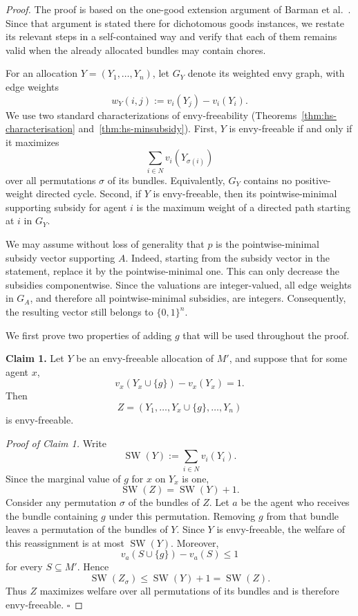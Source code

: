 \begin{proof}
The proof is based on the one-good extension argument of Barman et al.~\cite{BKNS22}. Since that argument is stated there for dichotomous goods instances, we restate its relevant steps in a self-contained way and verify that each of them remains valid when the already allocated bundles may contain chores.


For an allocation $Y=(Y_1,\ldots,Y_n)$, let $G_Y$ denote its weighted envy graph, with edge weights
\[
w_Y(i,j):=v_i(Y_j)-v_i(Y_i).
\]
We use two standard characterizations of envy-freeability
\cite{HS19,BKNS22} (Theorems~\ref{thm:hs-characterisation} and~\ref{thm:hs-minsubsidy}). First, $Y$ is envy-freeable if and only if it maximizes
\[
\sum_{i\in N}v_i(Y_{\sigma(i)})
\]
over all permutations $\sigma$ of its bundles. Equivalently, $G_Y$ contains no positive-weight directed cycle. Second, if $Y$ is envy-freeable, then its pointwise-minimal supporting subsidy for agent $i$ is the maximum weight of a directed path starting at $i$ in $G_Y$.

We may assume without loss of generality that $p$ is the pointwise-minimal subsidy vector supporting $A$. Indeed, starting from the subsidy vector in the statement, replace it by the pointwise-minimal one. This can only decrease the subsidies componentwise. Since the valuations are integer-valued, all edge weights in $G_A$, and therefore all pointwise-minimal subsidies, are integers. Consequently, the resulting vector still belongs to $\{0,1\}^n$.

We first prove two properties of adding $g$ that will be used throughout the proof.

\medskip
\noindent
\textbf{Claim 1.}
Let $Y$ be an envy-freeable allocation of $M'$, and suppose that for some agent $x$,
\[
v_x(Y_x\cup\{g\})-v_x(Y_x)=1.
\]
Then
\[
Z=(Y_1,\ldots,Y_x\cup\{g\},\ldots,Y_n)
\]
is envy-freeable.

\smallskip
\noindent
\emph{Proof of Claim 1.}
Write
\[
\operatorname{SW}(Y):=\sum_{i\in N}v_i(Y_i).
\]
Since the marginal value of $g$ for $x$ on $Y_x$ is one,
\[
\operatorname{SW}(Z)=\operatorname{SW}(Y)+1.
\]
Consider any permutation $\sigma$ of the bundles of $Z$. Let $a$ be the agent who receives the bundle containing $g$ under this permutation. Removing $g$ from that bundle leaves a permutation of the bundles of $Y$. Since $Y$ is envy-freeable, the welfare of this reassignment is at most
$\operatorname{SW}(Y)$. Moreover,
\[
v_a(S\cup\{g\})-v_a(S)\leq 1
\]
for every $S\subseteq M'$. Hence
\[
\operatorname{SW}(Z_\sigma)
\leq \operatorname{SW}(Y)+1
=\operatorname{SW}(Z).
\]
Thus $Z$ maximizes welfare over all permutations of its bundles and is therefore envy-freeable.
\hfill$\square$


\end{proof}
